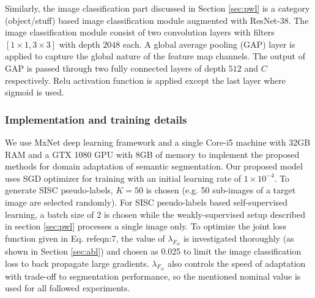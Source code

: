 \documentclass[10pt,twocolumn,letterpaper]{article}
\begin{document}
Similarly, the image classification part discussed in Section \ref{sec:pwl} is a category (object/stuff) based image classification module augmented with ResNet-38. The image classification module consist of two convolution layers with filters $[1 \times 1, 3 \times 3]$ with depth $2048$ each. A global average pooling (GAP) layer is applied to capture the global nature of the feature map channels. The output of GAP is passed through two fully connected layers of depth $512$ and $C$ respectively. Relu activation function is applied except the last layer where sigmoid is used. 
\vspace{-0.4cm}
\subsubsection{Implementation and training details}
\vspace{-0.1cm}

We use MxNet \cite{mxnet15} deep learning framework and a single Core-i5 machine with 32GB RAM and a GTX 1080 GPU with 8GB of memory to implement the proposed methods for domain adaptation of semantic segmentation. Our proposed model uses SGD optimizer for training with an initial learning rate of $1 \times 10^{-4}$. To generate SISC pseudo-labels, $K=50$ is chosen (e.g. 50 sub-images of a target image are selected randomly).
For SISC pseudo-labels based self-supervised learning, a batch size of 2 is chosen while the weakly-supervised setup described in section \ref{sec:pwl} processes a single image only. To optimize the joint loss function given in Eq. ref{eqn:7}, the value of $\lambda_{F_{cl}}$ is investigated thoroughly (as shown in Section \ref{sec:abl}) and chosen as 0.025 to limit the image classification loss to back propagate large gradients. $\lambda_{F_{cl}}$ also controls the speed of adaptation with trade-off to segmentation performance, so the mentioned nominal value is used for all followed experiments. 
\end{document}
